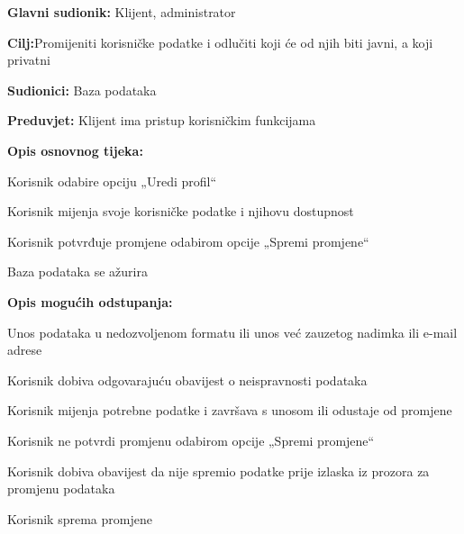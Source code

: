 						\begin{packed_item}
							
							\item \textbf{Glavni sudionik: }Klijent, administrator
							\item  \textbf{Cilj:}Promijeniti korisničke podatke i odlučiti koji će od njih biti javni, a koji privatni
							\item  \textbf{Sudionici:} Baza podataka
							\item  \textbf{Preduvjet:} Klijent ima pristup korisničkim funkcijama
							\item  \textbf{Opis osnovnog tijeka:}
							
							\item[] \begin{packed_enum}
								
								\item Korisnik odabire opciju „Uredi profil“  
								\item Korisnik mijenja svoje korisničke podatke i njihovu dostupnost 
								\item Korisnik potvrđuje promjene odabirom opcije „Spremi promjene“ 
								\item Baza podataka se ažurira 
								
								
							\end{packed_enum}
							
							\item  \textbf{Opis mogućih odstupanja:}
							
							\item[] \begin{packed_item}
								
								\item[2.a] Unos podataka u nedozvoljenom formatu ili unos već zauzetog nadimka ili e-mail adrese 
								\item[] \begin{packed_enum}
									
									\item Korisnik dobiva odgovarajuću obavijest o neispravnosti podataka 
									\item Korisnik mijenja potrebne podatke i završava s unosom ili odustaje od promjene 
									
								\end{packed_enum}
								\item[3.a] Korisnik ne potvrdi promjenu odabirom opcije „Spremi promjene“    
								\item[] \begin{packed_enum}
									
									\item Korisnik dobiva obavijest da nije spremio podatke prije izlaska iz prozora za promjenu podataka   
									\item Korisnik sprema promjene 
									
								\end{packed_enum}
								
								
								
							\end{packed_item}
						\end{packed_item}
